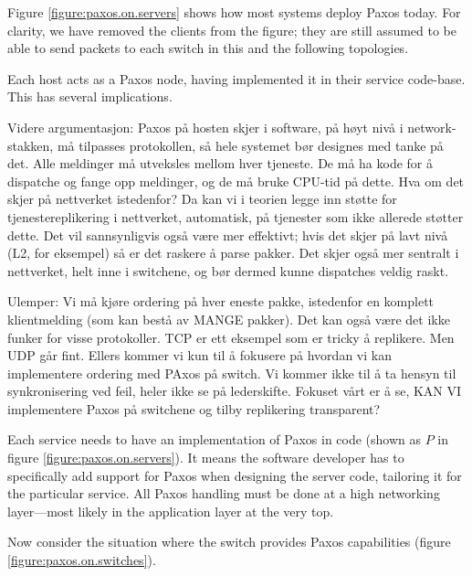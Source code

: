 Figure \vref{figure:paxos.on.servers} shows how most systems deploy Paxos
today.  For clarity, we have removed the clients from the figure; they are
still assumed to be able to send packets to each switch in this and the
following topologies.

Each host acts as a Paxos node, having implemented it in their service
code-base.  This has several implications.

Videre argumentasjon: Paxos på hosten skjer i software, på høyt nivå i
network-stakken, må tilpasses protokollen, så hele systemet bør designes med
tanke på det.  Alle meldinger må utveksles mellom hver tjeneste. De må ha
kode for å dispatche og fange opp meldinger, og de må bruke CPU-tid på
dette. Hva om det skjer på nettverket istedenfor? Da kan vi i teorien legge
inn støtte for tjenestereplikering i nettverket, automatisk, på tjenester
som ikke allerede støtter dette. Det vil sannsynligvis også være mer
effektivt; hvis det skjer på lavt nivå (L2, for eksempel) så er det raskere
å parse pakker. Det skjer også mer sentralt i nettverket, helt inne i
switchene, og bør dermed kunne dispatches veldig raskt. 

Ulemper: Vi må kjøre
ordering på hver eneste pakke, istedenfor en komplett klientmelding (som kan
bestå av MANGE pakker). Det kan også være det ikke funker for visse
protokoller. TCP er ett eksempel som er tricky å replikere. Men UDP går
fint. Ellers kommer vi kun til å fokusere på hvordan vi kan implementere
ordering med PAxos på switch. Vi kommer ikke til å ta hensyn til
synkronisering ved feil, heler ikke se på lederskifte. Fokuset vårt er å se,
KAN VI implementere Paxos på switchene og tilby replikering transparent?

Each service needs to have an implementation of Paxos in code (shown as
$P$ in figure \ref{figure:paxos.on.servers}).  It means the software
developer has to specifically add support for Paxos when designing the
server code, tailoring it for the particular service.  All Paxos handling
must be done at a high networking layer---most
likely in the application layer at the very top.

Now consider the situation where the switch provides Paxos
capabilities (figure \ref{figure:paxos.on.switches}).

